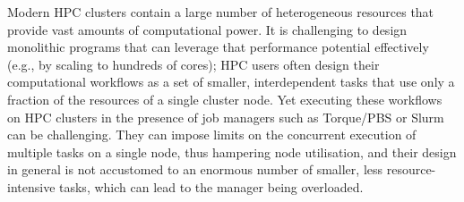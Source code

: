 Modern HPC clusters contain a large number of heterogeneous resources that provide vast amounts of
computational power. It is challenging to design monolithic programs that can leverage that
performance potential effectively (e.g., by scaling to hundreds of cores); HPC users often design
their computational workflows as a set of smaller, interdependent tasks that use only a fraction of
the resources of a single cluster node. Yet executing these workflows on HPC clusters in the
presence of job managers such as Torque/PBS or Slurm can be challenging. They can impose limits on
the concurrent execution of multiple tasks on a single node, thus hampering node utilisation, and
their design in general is not accustomed to an enormous number of smaller, less resource-intensive
tasks, which can lead to the manager being overloaded.

